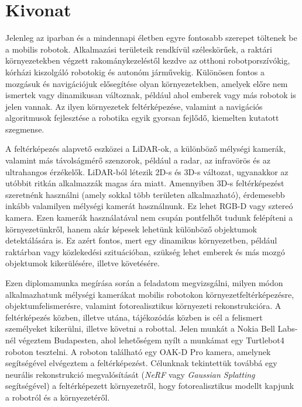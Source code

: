 \setcounter{page}{1}

\selecthungarian

\chapter*{Kivonat}

Jelenleg az iparban és a mindennapi életben egyre fontosabb szerepet töltenek be a mobilis robotok. Alkalmazási területeik rendkívül széleskörűek, a raktári környezetekben végzett rakománykezeléstől kezdve az otthoni robotporszívókig, kórházi kiszolgáló robotokig és autonóm járművekig. Különösen fontos a mozgásuk és navigációjuk elősegítése olyan környezetekben, amelyek előre nem ismertek vagy dinamikusan változnak, például ahol emberek vagy más robotok is jelen vannak. Az ilyen környezetek feltérképezése, valamint a navigációs algoritmusok fejlesztése a robotika egyik gyorsan fejlődő, kiemelten kutatott szegmense.

A feltérképezés alapvető eszközei a LiDAR-ok, a különböző mélységi kamerák, valamint más távolságmérő szenzorok, például a radar, az infravörös és az ultrahangos érzékelők. LiDAR-ból létezik 2D-s és 3D-s változat, ugyanakkor az utóbbit ritkán alkalmazzák magas ára miatt. Amennyiben 3D-s feltérképezést szeretnénk használni (amely sokkal több területen alkalmazható), érdemesebb inkább valamilyen mélységi kamerát használnunk. Ez lehet RGB-D vagy sztereó kamera. Ezen kamerák használatával nem csupán pontfelhőt tudunk felépíteni a környezetünkről, hanem akár képesek lehetünk különböző objektumok detektálására is. Ez azért fontos, mert egy dinamikus környezetben, például raktárban vagy közlekedési szituációban, szükség lehet emberek és más mozgó objektumok kikerülésére, illetve követésére.

Ezen diplomamunka megírása során a feladatom megvizsgálni, milyen módon alkalmazhatunk mélységi kamerákat mobilis robotokon környezetfeltérképezésre,  objektumfelismerésre, valamint fotorealisztikus környezeti rekonstrukcióra. A feltérképezés közben, illetve utána,  tájékozódás közben is cél a felismert személyeket kikerülni, illetve követni a robottal. Jelen munkát a Nokia Bell Labs-nél végeztem Budapesten, ahol lehetőségem nyílt a munkámat egy Turtlebot4 roboton tesztelni. A roboton található egy OAK-D Pro kamera, amelynek segítségével elvégeztem a feltérképezést. Célunknak tekintettük továbbá egy neurális rekonstrukció megvalósítását (\textit{NeRF} vagy \textit{Gaussian Splatting} segítségével) a feltérképezett környezetről, hogy fotorealisztikus modellt kapjunk a robotról és a környezetéről.


